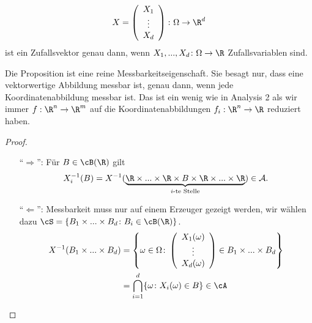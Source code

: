 \begin{prop}\label{zweiInterpr}
	\[ X =\left(\begin{array}{c} X_1 \\ \vdots \\ X_d\end{array}\right)\colon \Omega \to \R^d \] ist ein Zufallsvektor genau dann, wenn $X_1,...,X_d \colon \Omega \to \R$ Zufallsvariablen sind.
\end{prop}
Die Proposition ist eine reine Messbarkeitseigenschaft. Sie besagt nur, dass eine vektorwertige Abbildung messbar ist, genau dann, wenn jede Koordinatenabbildung messbar ist. Das ist ein wenig wie in Analysis 2 als wir immer $f:\R^n\to \R^m$ auf die Koordinatenabbildungen $f_i:\R^n\to \R$ reduziert haben.
\begin{proof}
	\begin{itemize}
		\item[\enquote{$\Rightarrow$}:] 	Für $B \in \cB(\R)$ gilt 
\[ X_i^{-1} (B) = X^{-1}(\underbrace{\R \times ... \times \R \times B \times \R \times ... \times \R}_{i\text{-te Stelle}}) \in \mathcal A. \]
		\item[\enquote{$\Leftarrow$}:] Messbarkeit muss nur auf einem Erzeuger gezeigt werden, wir wählen dazu $\cS = \{ B_1 \times ... \times B_d\colon B_i \in \cB(\R) \}$.
		\begin{align*}
			X^{-1}(B_1 \times ... \times B_d) &= \left\{ \omega\in \Omega\colon 
			\left(\begin{array}{c} X_1(\omega)\\\vdots\\ X_d(\omega)\end{array}\right) \in B_1 \times ... \times B_d \right\} \\
			&= \bigcap_{i=1}^{d} \{ \omega \colon X_i(\omega) \in B \} \in \cA 
		\end{align*}
	\end{itemize}
\end{proof}

